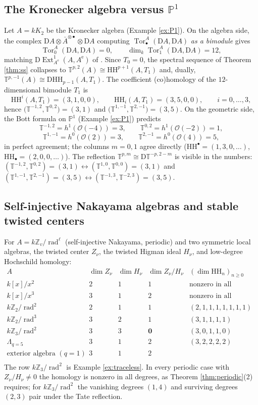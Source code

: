 \documentclass[11pt]{amsart}
\theoremstyle{definition}
\newcommand{\T}{\mathbb{T}}
\newcommand{\HH}{\mathrm{HH}}
\newcommand{\D}{\mathrm{D}}
\newcommand{\Ext}{\operatorname{Ext}}
\newcommand{\Tor}{\operatorname{Tor}}
\newcommand{\rad}{\operatorname{rad}}
\newcommand{\Ae}{A^{\mathrm{e}}}
\newcommand{\kk}{k}
\begin{document}
\subsection{The Kronecker algebra versus $\mathbb P^1$}\label{subsec:kron}
Let $A=\kk K_2$ be the Kronecker algebra (Example \ref{ex:P1}). On the
algebra side, the complex $\D A\otimes\bar A^{\otimes\bullet}\otimes\D A$
computing $\Tor^A_\bullet(\D A,\D A)$ \emph{as a bimodule} gives
\[
\Tor_0^A(\D A,\D A)=0,\qquad \dim_\kk\Tor_1^A(\D A,\D A)=12,
\]
matching $\D\Ext^1_{\Ae}(A,\Ae)$ of \cite[Example 4.7]{ArmTau}. Since
$T_0=0$, the spectral sequence of Theorem \ref{thm:ss} collapses to
$\T^{p,2}(A)\cong\HH^{p+1}(A,T_1)$ and, dually,
$\T^{p,-1}(A)\cong\D\HH_{p-1}(A,T_1)$. The coefficient (co)homology of the
$12$-dimensional bimodule $T_1$ is
\[
\HH^i(A,T_1)=(3,1,0,0),\qquad \HH_i(A,T_1)=(3,5,0,0),\qquad i=0,\dots,3,
\]
hence $\bigl(\T^{-1,2},\T^{0,2}\bigr)=(3,1)$ and
$\bigl(\T^{1,-1},\T^{2,-1}\bigr)=(3,5)$. On the geometric side, the Bott
formula on $\mathbb P^1$ (Example \ref{ex:P1}) predicts
\[
\T^{-1,2}=h^1(\mathcal O(-4))=3,\qquad
\T^{0,2}=h^1(\mathcal O(-2))=1,\]\[
\T^{1,-1}=h^0(\mathcal O(2))=3,\qquad
\T^{2,-1}=h^0(\mathcal O(4))=5,
\]
in perfect agreement; the columns $m=0,1$ agree directly
($\HH^\bullet=(1,3,0,\dots)$, $\HH_\bullet=(2,0,0,\dots)$). The reflection
$\T^{p,m}\cong\D\T^{-p,2-m}$ is visible in the numbers:
$(\T^{-1,2},\T^{0,2})=(3,1)\leftrightarrow(\T^{1,0},\T^{0,0})=(3,1)$ and
$(\T^{1,-1},\T^{2,-1})=(3,5)\leftrightarrow(\T^{-1,3},\T^{-2,3})=(3,5)$.

\subsection{Self-injective Nakayama algebras and stable twisted centers}
For $A=\kk\mathbb Z_v/\rad^\ell$ (self-injective Nakayama, periodic) and two
symmetric local algebras, the twisted center $Z_\nu$, the twisted Higman
ideal $H_\nu$, and low-degree Hochschild homology:
\[
\begin{array}{l|ccc|l}
A & \dim Z_\nu & \dim H_\nu & \dim Z_\nu/H_\nu & (\dim\HH_n)_{n\ge0}\\
\hline
\kk[x]/x^2 & 2 & 1 & 1 & \text{nonzero in all degrees}\\
\kk[x]/x^3 & 3 & 1 & 2 & \text{nonzero in all degrees}\\
\kk\mathbb Z_2/\rad^2 & 2 & 1 & 1 & (2,1,1,1,1,1,1,1)\\
\kk\mathbb Z_2/\rad^3 & 3 & 2 & 1 & (3,1,1,1,1)\\
\kk\mathbb Z_3/\rad^2 & 3 & 3 & \mathbf{0} & (3,0,1,1,0)\\
\Lambda_{q=5} & 3 & 1 & 2 & (3,2,2,2,2)\\
\text{exterior algebra }(q=1) & 3 & 1 & 2 & \\
\end{array}
\]
The row $\kk\mathbb Z_3/\rad^2$ is Example \ref{ex:traceless}. In every
periodic case with $Z_\nu/H_\nu\neq0$ the homology is nonzero in all
degrees, as Theorem \ref{thm:periodic}(2) requires; for
$\kk\mathbb Z_3/\rad^2$ the vanishing degrees $(1,4)$ and surviving degrees
$(2,3)$ pair under the Tate reflection.
\end{document}
